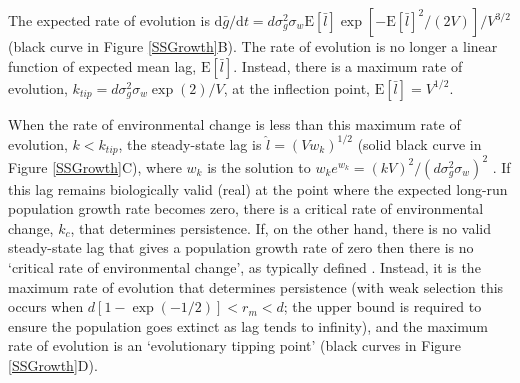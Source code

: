 \documentclass[12pt,letterpaper]{article} %
\begin{document}
The expected rate of evolution is $\mathrm{d}\bar{g}/\mathrm{d}t  = d\sigma_g^2 \sigma_w \mathrm{E}[\bar{l}] \exp\left[ -\mathrm{E}[\bar{l}]^2 / (2V) \right] / V^{3/2}$ (black curve in Figure \ref{SSGrowth}B).
The rate of evolution is no longer a linear function of expected mean lag, $\mathrm{E}[\bar{l}]$.
Instead, there is a maximum rate of evolution, $k_{tip} = d \sigma_g^2 \sigma_w \exp(2)/V$, at the inflection point, $\mathrm{E}[\bar{l}] = V^{1/2}$.

When the rate of environmental change is less than this maximum rate of evolution, $k<k_{tip}$, the steady-state lag is $\hat{l} = (V w_k)^{1/2}$ (solid black curve in Figure \ref{SSGrowth}C), where $w_k$ is the solution to $w_k e^{w_k} = (k V)^2 / (d\sigma_g^2\sigma_w)^2$ \citep[i.e., $w_k(x)$ is the Lambert W function, and here $x=(k V)^2 / (d\sigma_g^2\sigma_w)^2$;][]{Lehtonen2016}.
If this lag remains biologically valid (real) at the point where the expected long-run population growth rate becomes zero, there is a critical rate of environmental change, $k_c$, that determines persistence. %
If, on the other hand, there is no valid steady-state lag that gives a population growth rate of zero then there is no `critical rate of environmental change', as typically defined \citep{Lynch1993}.
Instead, it is the maximum rate of evolution that determines persistence (with weak selection this occurs when $d[1-\exp(-1/2)]<r_m<d$; the upper bound is required to ensure the population goes extinct as lag tends to infinity), and the maximum rate of evolution is an `evolutionary tipping point' (black curves in Figure \ref{SSGrowth}D).
\end{document}
